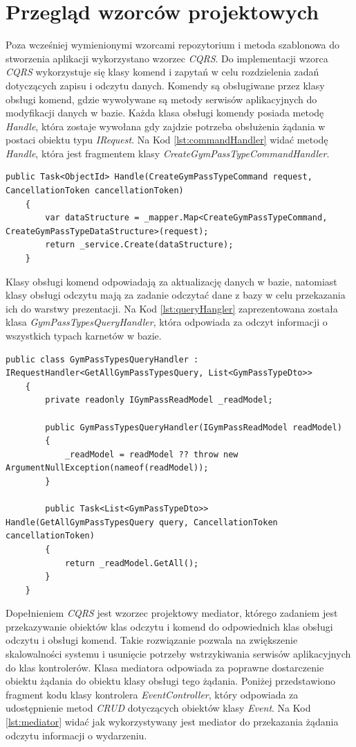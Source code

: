 \documentclass[a4paper,twoside,12pt]{book}
\begin{document}
\section{Przegląd wzorców projektowych}
Poza wcześniej wymienionymi wzorcami repozytorium i metoda szablonowa do stworzenia aplikacji wykorzystano wzorzec \textit{CQRS}. Do implementacji wzorca \textit{CQRS} wykorzystuje się klasy komend i zapytań w celu rozdzielenia zadań dotyczących zapisu i odczytu danych. Komendy są obsługiwane przez klasy obsługi komend, gdzie wywoływane są metody serwisów aplikacyjnych do modyfikacji danych w bazie. Każda klasa obsługi komendy posiada metodę \textit{Handle}, która zostaje wywołana gdy zajdzie potrzeba obsłużenia żądania w postaci obiektu typu \textit{IRequest}. Na Kod \ref{lst:commandHandler} widać metodę \textit{Handle}, która jest fragmentem klasy \textit{CreateGymPassTypeCommandHandler}.
\begin{lstlisting}[caption={Metoda \textit{Handle} klasy \textit{CreateGymPassTypeCommandHandler}}, label={lst:commandHandler}]
	public Task<ObjectId> Handle(CreateGymPassTypeCommand request, CancellationToken cancellationToken)
	{
		var dataStructure = _mapper.Map<CreateGymPassTypeCommand, CreateGymPassTypeDataStructure>(request);
		return _service.Create(dataStructure);
	}
\end{lstlisting}
Klasy obsługi komend odpowiadają za aktualizację danych w bazie, natomiast klasy obsługi odczytu mają za zadanie odczytać dane z bazy w celu przekazania ich do warstwy prezentacji. Na Kod \ref{lst:queryHangler} zaprezentowana została klasa \textit{GymPassTypesQueryHandler}, która odpowiada za odczyt informacji o wszystkich typach karnetów w bazie.
\begin{lstlisting}[caption={Klasa \textit{GymPassTypesQueryHandler}}, label={lst:queryHangler}]
	public class GymPassTypesQueryHandler : IRequestHandler<GetAllGymPassTypesQuery, List<GymPassTypeDto>>
	{
		private readonly IGymPassReadModel _readModel;
		
		public GymPassTypesQueryHandler(IGymPassReadModel readModel)
		{
			_readModel = readModel ?? throw new ArgumentNullException(nameof(readModel));
		}
		
		public Task<List<GymPassTypeDto>> Handle(GetAllGymPassTypesQuery query, CancellationToken cancellationToken)
		{
			return _readModel.GetAll();
		}
	}
\end{lstlisting}
Dopełnieniem \textit{CQRS} jest wzorzec projektowy mediator, którego zadaniem jest przekazywanie obiektów klas odczytu i komend do odpowiednich klas obsługi odczytu i obsługi komend. Takie rozwiązanie pozwala na zwiększenie skalowalności systemu i usunięcie potrzeby wstrzykiwania serwisów aplikacyjnych do klas kontrolerów. Klasa mediatora odpowiada za poprawne dostarczenie obiektu żądania do obiektu klasy obsługi tego żądania. Poniżej przedstawiono fragment kodu klasy kontrolera \textit{EventController}, który odpowiada za udostępnienie metod \textit{CRUD} dotyczących obiektów klasy \textit{Event}. Na Kod \ref{lst:mediator} widać jak wykorzystywany jest mediator do przekazania żądania odczytu informacji o wydarzeniu.
\end{document}

